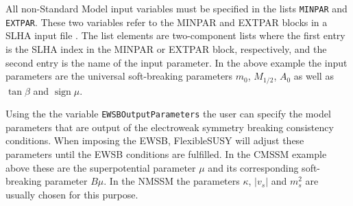 \documentclass[final,3p,11pt,pdflatex]{elsarticle}
\makeatletter
\newcommand{\fs}{FlexibleSUSY\@\xspace}
\newcommand{\code}[1]{\lstinline|#1|}  %
\DeclareMathOperator{\sign}{sign}
\makeatother
\begin{document}
All non-Standard Model input variables must be specified in the lists
\code{MINPAR} and \code{EXTPAR}.  These two variables refer to the
MINPAR and EXTPAR blocks in a SLHA input file \cite{Skands:2003cj}.
The list elements are two-component lists where the first entry is the
SLHA index in the MINPAR or EXTPAR block, respectively, and the second
entry is the name of the input parameter.  In the above example the
input parameters are the universal soft-breaking parameters $m_0$,
$M_{1/2}$, $A_0$ as well as $\tan\beta$ and $\sign\mu$.

Using the the variable \code{EWSBOutputParameters} the user can
specify the model parameters that are output of the electroweak
symmetry breaking consistency conditions.  When imposing the EWSB, \fs
will adjust these parameters until the EWSB conditions are fulfilled.
In the CMSSM example above these are the superpotential parameter
$\mu$ and its corresponding soft-breaking parameter $B\mu$.  In the
NMSSM the parameters $\kappa$, $|v_s|$ and $m_s^2$ are usually chosen
for this purpose.
\end{document}
